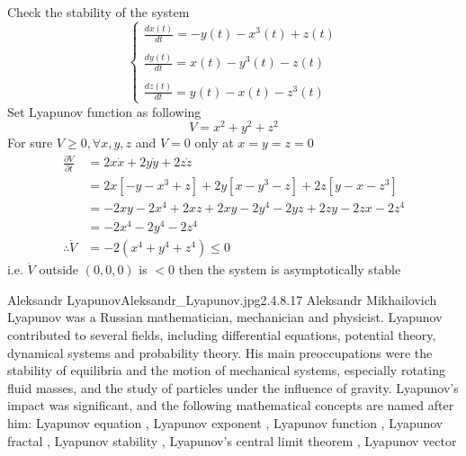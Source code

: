 \begin{example}
    Check the stability of the system
    \begin{equation*}
        \begin{cases}
            \displaystyle \frac{dx(t)}{dt} = -y(t) - x^3(t) + z(t)
            \\\\
            \displaystyle \frac{dy(t)}{dt} = x(t) - y^3(t) - z(t)
            \\\\
            \displaystyle \frac{dz(t)}{dt} = y(t) - x(t) - z^3(t)
        \end{cases}
    \end{equation*}
    Set Lyapunov function as following
    \[
        V = x^2 + y^2 + z^2
    \]
    For sure $V \geq 0 , \forall x,y,z$ and $V = 0$ only at $x=y=z=0 $
    \begin{align*}
        \frac{\partial V}{\partial t} & = 2x \dot{x} +2y\dot{y} +2z \dot{z}
        \\
                                      & = 2x[-y - x^3 + z] +2y[x - y^3 - z] +2z[y - x - z^3]
        \\
                                      & =-2xy -2x^4 + 2xz +2xy -2y^4 -2yz +2zy -2zx -2z^4
        \\
                                      & = -2x^4 -2y^4 -2z^4
        \\
        \therefore \dot{V}            & =  -2(x^4 + y^4 + z^4) \leq 0
    \end{align*}
    i.e. $\dot{V}$ outside $(0,0,0)$ is $<0$ then the system is asymptotically stable
\end{example}
\begin{enrichment}{Aleksandr Lyapunov}{Aleksandr_Lyapunov.jpg}{2.4}{.8}{.17}
    Aleksandr Mikhailovich Lyapunov was a Russian mathematician, mechanician and physicist. Lyapunov contributed to several fields, including differential equations, potential theory, dynamical systems and probability theory. His main preoccupations were the stability of equilibria and the motion of mechanical systems, especially rotating fluid masses, and the study of particles under the influence of gravity.
    Lyapunov's impact was significant, and the following mathematical concepts are named after him:
    Lyapunov equation ,
    Lyapunov exponent ,
    Lyapunov function ,
    Lyapunov fractal ,
    Lyapunov stability ,
    Lyapunov's central limit theorem ,
    Lyapunov vector
\end{enrichment}
\setcounter{equation}{0}
\newpage
